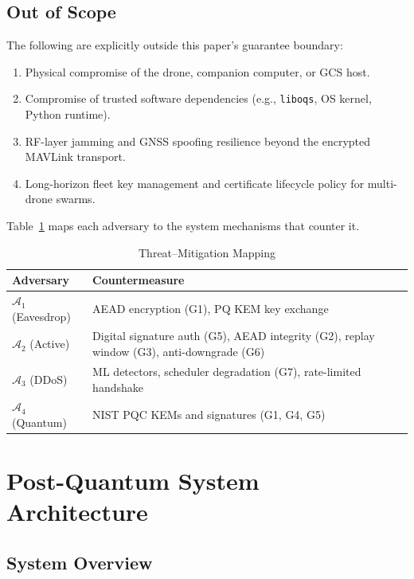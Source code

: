 \documentclass[conference]{IEEEtran}
\begin{document}
\subsection{Out of Scope}

The following are explicitly outside this paper's guarantee boundary:
\begin{enumerate}[label=\textbf{O\arabic*}]
    \item Physical compromise of the drone, companion computer, or GCS host.
    \item Compromise of trusted software dependencies (e.g., \texttt{liboqs}, OS kernel, Python runtime).
    \item RF-layer jamming and GNSS spoofing resilience beyond the encrypted MAVLink transport.
    \item Long-horizon fleet key management and certificate lifecycle policy for multi-drone swarms.
\end{enumerate}

Table~\ref{tab:threat-mitigation} maps each adversary to the system mechanisms that counter it.

\begin{table}[t]
\centering
\caption{Threat--Mitigation Mapping}
\label{tab:threat-mitigation}
\small
\begin{tabular}{@{}lp{5.5cm}@{}}
\toprule
\textbf{Adversary} & \textbf{Countermeasure} \\
\midrule
$\mathcal{A}_1$ (Eavesdrop) & AEAD encryption (G1), PQ KEM key exchange \\
$\mathcal{A}_2$ (Active) & Digital signature auth (G5), AEAD integrity (G2), replay window (G3), anti-downgrade (G6) \\
$\mathcal{A}_3$ (DDoS) & ML detectors, scheduler degradation (G7), rate-limited handshake \\
$\mathcal{A}_4$ (Quantum) & NIST PQC KEMs and signatures (G1, G4, G5) \\
\bottomrule
\end{tabular}
\end{table}

\section{Post-Quantum System Architecture}
\label{sec:arch}

\subsection{System Overview}
\end{document}
